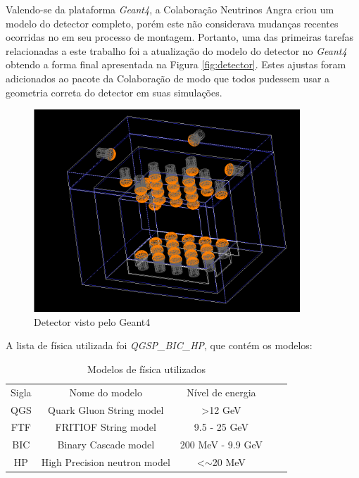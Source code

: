 Valendo-se da plataforma \textit{Geant4}, a Colaboração Neutrinos Angra criou um modelo do detector completo, porém este não considerava mudanças recentes ocorridas no em seu processo de montagem. Portanto, uma das primeiras tarefas relacionadas a este trabalho foi a atualização do modelo do detector no \textit{Geant4} obtendo a forma final apresentada na Figura \ref{fig:detector}. Estes ajustas foram adicionados ao pacote da Colaboração de modo que todos pudessem usar a geometria correta do detector em suas simulações. 

\begin{figure}[H]
	\centering
	\includegraphics[width=10cm]{textuais/simulacao/figuras/sim_det.png}
	\caption{Detector visto pelo Geant4}
	\label{fig:simdetector}
\end{figure}

A lista de física utilizada foi \emph{QGSP\_BIC\_HP}, que contém os modelos:



\begin{table}[H]
	\centering
	\begin{tabular}{|c|c|c|ll}
		\cline{1-3}
		Sigla & Nome do modelo               & Nível de energia        &  &  \\ \cline{1-3}
		QGS   & Quark Gluon String model     & \textgreater 12 GeV     &  &  \\ \cline{1-3}
		FTF   & FRITIOF String model         & 9.5 - 25 GeV            &  &  \\ \cline{1-3}
		BIC   & Binary Cascade model         & 200 MeV - 9.9 GeV       &  &  \\ \cline{1-3}
		HP    & High Precision neutron model & \textless{}$\sim$20 MeV &  &  \\ \cline{1-3}
	\end{tabular}
	\caption{Modelos de física utilizados}
\end{table}

